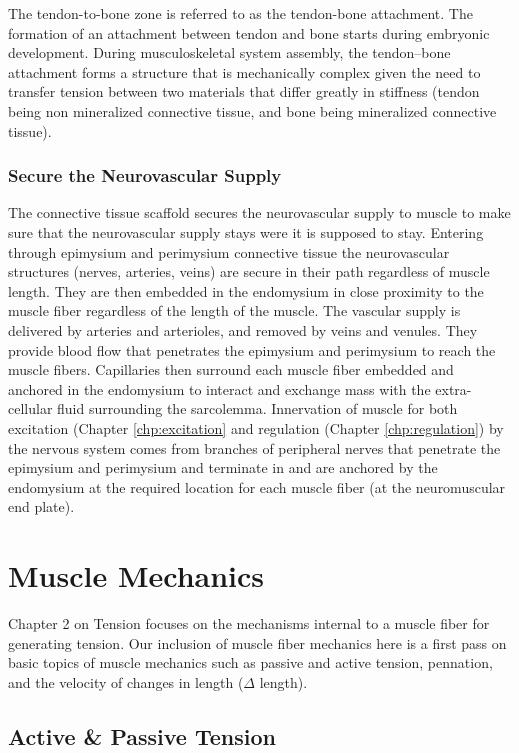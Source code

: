 The tendon-to-bone zone is referred to as the tendon-bone attachment. The formation of an attachment between tendon and bone starts during embryonic development. During musculoskeletal system assembly, the tendon–bone attachment  forms a structure that is mechanically complex given the need to transfer tension between two materials that differ greatly in stiffness (tendon being non mineralized connective tissue, and bone being mineralized connective tissue).    

\subsubsection{Secure the Neurovascular Supply}
The connective tissue scaffold secures the neurovascular supply to muscle to make sure that the neurovascular supply stays were it is supposed to stay. Entering through epimysium and perimysium connective tissue the neurovascular structures (nerves, arteries, veins) are secure in their path regardless of muscle length. They are then embedded in the endomysium in close proximity to the muscle fiber regardless of the length of the muscle. The vascular supply is delivered by arteries and arterioles, and removed by veins and venules. They provide blood flow that penetrates the epimysium and perimysium to reach the muscle fibers. Capillaries then surround each muscle fiber embedded and anchored in the endomysium to interact and exchange mass with the extra-cellular fluid surrounding the sarcolemma. Innervation of muscle for both excitation (Chapter \ref{chp:excitation} and regulation (Chapter \ref{chp:regulation}) by the nervous system comes from branches of peripheral nerves that penetrate the epimysium and perimysium and terminate in and are anchored by the endomysium at the required location for each muscle fiber (at the neuromuscular end plate).


\section{Muscle Mechanics}

Chapter 2 on Tension focuses on the mechanisms internal to a muscle fiber for generating tension. Our inclusion of muscle fiber mechanics here is a first pass on basic topics of muscle mechanics such as passive and active tension, pennation, and the velocity of changes in length ($\Delta$ length).


\subsection{Active \& Passive Tension}

